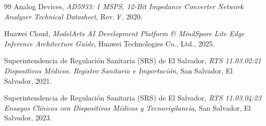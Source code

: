 \documentclass[11pt,a4paper]{article}
\begin{document}
\begin{thebibliography}{99}
Analog Devices, \textit{AD5933: 1 MSPS, 12-Bit Impedance Converter Network Analyzer Technical Datasheet}, Rev. F, 2020.

Huawei Cloud, \textit{ModelArts AI Development Platform \& MindSpore Lite Edge Inference Architecture Guide}, Huawei Technologies Co., Ltd., 2025.

Superintendencia de Regulación Sanitaria (SRS) de El Salvador, \textit{RTS 11.03.02:21 Dispositivos Médicos. Registro Sanitario e Importación}, San Salvador, El Salvador, 2021.

Superintendencia de Regulación Sanitaria (SRS) de El Salvador, \textit{RTS 11.03.04:23 Ensayos Clínicos con Dispositivos Médicos y Tecnovigilancia}, San Salvador, El Salvador, 2023.
\end{thebibliography}
\end{document}
